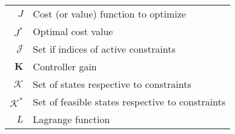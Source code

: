 \begin{scriptsize}
\begin{tabularx}{\textwidth}{r|X}
$J$                         & Cost (or value) function to optimize \\
$J^*$                       & Optimal cost value\\
$\mathcal{J}$               & Set if indices of active constraints\\
$\textbf{K}$                & Controller gain\\
$\mathcal{K}$               & Set of states respective to constraints\\
$\mathcal{K}^*$             & Set of feasible states respective to constraints\\
$L$                         & Lagrange function\\

\end{tabularx}
\end{scriptsize}
